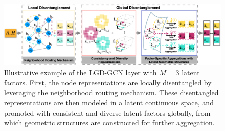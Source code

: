 \documentclass[accepted]{uai2021} %
\begin{document}
\begin{table}[t]
\centering
\setlength{\abovecaptionskip}{4pt}\makeatletter{}\makeatother
\caption{\small{Micro (Top) and Macro (Bottom) F1 scores (\%) on graphs synthesized with four latent factors but different average neighborhood sizes}}
\resizebox{0.485\textwidth}{!}{
\begin{tabular}{cccccc}
\hline
\multirow{2}{*}{\textbf{Methods}}  & \multicolumn{5}{c}{\textbf{Average Neighborhood Sizes}} \\ \cline{2-6}
& 40        & 30        & 20        & 10       & 6       \\ \hline
GCN                                
&79.5$\pm$0.8   &75.5$\pm$0.7   &66.1$\pm$0.9   &47.2$\pm$0.6   &37.2$\pm$0.9         \\
DisenGCN                          
&84.1$\pm$1.0   &79.5$\pm$0.7   &69.0$\pm$1.0   &48.8$\pm$0.9   &38.4$\pm$0.8         \\
\textbf{Improvements}                      
&\textbf{+4.6\%}    &\textbf{+4.0\%}    &\textbf{+2.9\%}    &\textbf{+1.6\%}    &\textbf{+1.2\%}
\\ \hline
GCN                                        
&78.3$\pm$0.9   &75.0$\pm$0.8   &65.8$\pm$1.0   &45.8$\pm$0.6   &36.7$\pm$0.8         \\
DisenGCN                          
&82.9$\pm$1.1   &78.9$\pm$0.7   &68.3$\pm$1.0   &47.4$\pm$1.0   &37.7$\pm$0.8         \\
\textbf{Improvements}                      
&\textbf{+4.6\%}            &\textbf{+3.9\%}              &\textbf{+2.5\%}            &\textbf{+1.6\%}            &\textbf{+1.0\%}         \\ \hline
\end{tabular}}
\label{tab:disengcn_limitation}
\end{table}

\begin{figure}[t]
\centering
\includegraphics[width=1.0\textwidth]{LGD_layer.png}
\caption{\small{Illustrative example of the LGD-GCN layer with $M=3$ latent factors. First, the node representations are locally disentangled by leveraging the neighborhood routing mechanism. These disentangled representations are then modeled in a latent continuous space, and promoted with consistent and diverse latent factors globally, from which geometric structures are constructed for further aggregation.}}
\label{fig:lgd_layer}
\end{figure}
\end{document}
